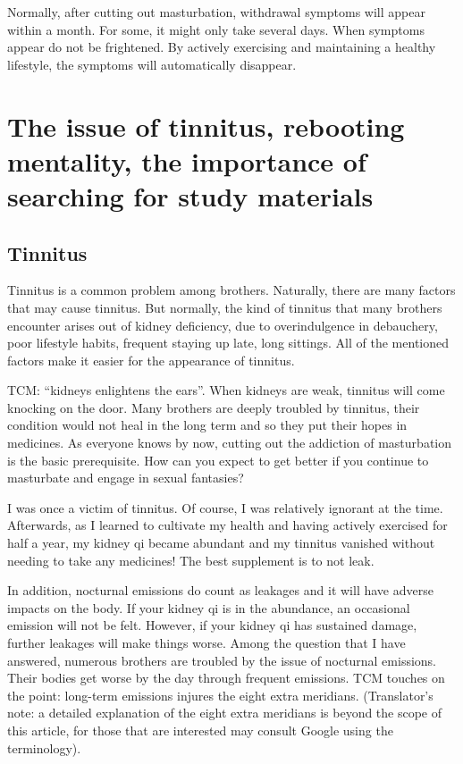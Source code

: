 \documentclass[
]{book}
\begin{document}
Normally, after cutting out masturbation, withdrawal symptoms will appear within a month. For some, it might only take several days. When symptoms appear do not be frightened. By actively exercising and maintaining a healthy lifestyle, the symptoms will automatically disappear.

\hypertarget{the-issue-of-tinnitus-rebooting-mentality-the-importance-of-searching-for-study-materials}{%
\chapter{The issue of tinnitus, rebooting mentality, the importance of searching for study materials}\label{the-issue-of-tinnitus-rebooting-mentality-the-importance-of-searching-for-study-materials}}

\hypertarget{tinnitus}{%
\section{Tinnitus}\label{tinnitus}}

Tinnitus is a common problem among brothers. Naturally, there are many factors that may cause tinnitus. But normally, the kind of tinnitus that many brothers encounter arises out of kidney deficiency, due to overindulgence in debauchery, poor lifestyle habits, frequent staying up late, long sittings. All of the mentioned factors make it easier for the appearance of tinnitus.

TCM: ``kidneys enlightens the ears''. When kidneys are weak, tinnitus will come knocking on the door. Many brothers are deeply troubled by tinnitus, their condition would not heal in the long term and so they put their hopes in medicines. As everyone knows by now, cutting out the addiction of masturbation is the basic prerequisite. How can you expect to get better if you continue to masturbate and engage in sexual fantasies?

I was once a victim of tinnitus. Of course, I was relatively ignorant at the time. Afterwards, as I learned to cultivate my health and having actively exercised for half a year, my kidney qi became abundant and my tinnitus vanished without needing to take any medicines! The best supplement is to not leak.

In addition, nocturnal emissions do count as leakages and it will have adverse impacts on the body. If your kidney qi is in the abundance, an occasional emission will not be felt. However, if your kidney qi has sustained damage, further leakages will make things worse. Among the question that I have answered, numerous brothers are troubled by the issue of nocturnal emissions. Their bodies get worse by the day through frequent emissions. TCM touches on the point: long-term emissions injures the eight extra meridians. (Translator's note: a detailed explanation of the eight extra meridians is beyond the scope of this article, for those that are interested may consult Google using the terminology).
\end{document}

